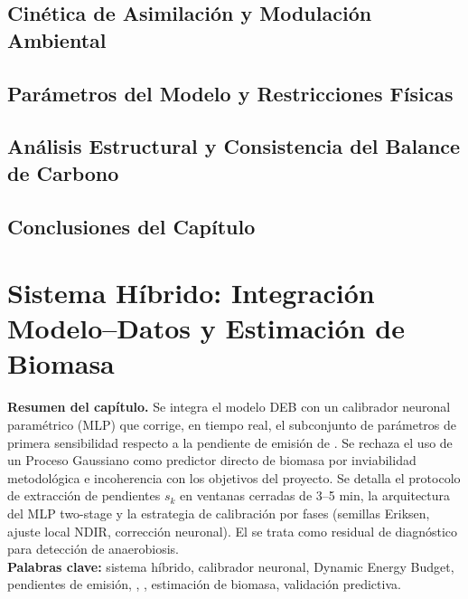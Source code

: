 \documentclass[10pt,spanish,fleqn,openany,twoside,letterpaper]{book}
\begin{document}
\section{Cinética de Asimilación y Modulación Ambiental}
\label{sec:cap3_cinetica}


\section{Parámetros del Modelo y Restricciones Físicas}
\label{sec:cap3_parametros}


\section{Análisis Estructural y Consistencia del Balance de Carbono}
\label{sec:cap3_analisis}


\section{Conclusiones del Capítulo}
\label{sec:cap3_conclusiones}


\chapter{Sistema Híbrido: Integración Modelo--Datos y Estimación de Biomasa}
\label{chap:hibrido}

\begin{center}
\small
\textbf{Resumen del capítulo.}
Se integra el modelo DEB con un calibrador neuronal paramétrico (MLP) que corrige, en tiempo real, el subconjunto de parámetros de primera sensibilidad respecto a la pendiente de emisión de . Se rechaza el uso de un Proceso Gaussiano como predictor directo de biomasa por inviabilidad metodológica e incoherencia con los objetivos del proyecto. Se detalla el protocolo de extracción de pendientes $s_k$ en ventanas cerradas de 3--5 min, la arquitectura del MLP two-stage y la estrategia de calibración por fases (semillas Eriksen, ajuste local NDIR, corrección neuronal). El  se trata como residual de diagnóstico para detección de anaerobiosis.\\
\textbf{Palabras clave:} sistema híbrido, calibrador neuronal, Dynamic Energy Budget, pendientes de emisión, , , estimación de biomasa, validación predictiva.
\end{center}
\end{document}
